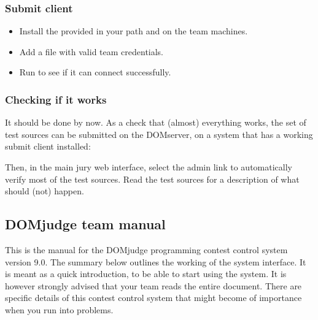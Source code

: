 \documentclass[a4paper,10pt,english,openany]{sphinxmanual}
\begin{document}
\subsubsection{Submit client}
\label{\detokenize{quick-install:submit-client}}\begin{itemize}
\item {} 
\sphinxAtStartPar
Install the provided  in your path and on the team machines.

\item {} 
\sphinxAtStartPar
Add a  file with valid team credentials.

\item {} 
\sphinxAtStartPar
Run  to see if it can connect successfully.

\end{itemize}


\subsubsection{Checking if it works}
\label{\detokenize{quick-install:checking-if-it-works}}
\sphinxAtStartPar
It should be done by now. As a check that (almost) everything works,
the set of test sources can be submitted on the DOMserver, on
a system that has a working submit client installed:

\begin{sphinxVerbatim}[commandchars=\\\{\}]
 
 
\end{sphinxVerbatim}

\sphinxAtStartPar
Then, in the main jury web interface, select the admin link
 to automatically verify most of the
test sources. Read the test sources for a description of
what should (not) happen.

\sphinxstepscope


\subsection{DOMjudge team manual}
\label{\detokenize{team:domjudge-team-manual}}\label{\detokenize{team::doc}}

\sphinxAtStartPar
This is the manual for the DOMjudge programming contest control system
version 9.0.
The summary below outlines the working of the system interface. It
is meant as a quick introduction, to be able to start using the system.
It is however strongly advised that your team reads the entire document.
There are specific details of this contest control system that might
become of importance when you run into problems.
\end{document}
